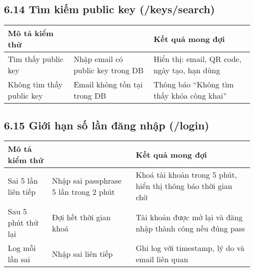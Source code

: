 \subsection*{6.14 Tìm kiếm public key (/keys/search)}
\begin{table}[H]
\centering
\begin{tabular}{|>{\centering\arraybackslash}p{4.3cm}|>{\arraybackslash}p{5cm}|>{\centering\arraybackslash}p{7.5cm}|}
\hline
\textbf{Mô tả kiểm thử} &
\multicolumn{1}{>{\centering\arraybackslash}p{5cm}|}{\textbf{Input}} & 
\textbf{Kết quả mong đợi} \\ \hline
Tìm thấy public key & Nhập email có public key trong DB & Hiển thị: email, QR code, ngày tạo, hạn dùng \\ \hline
Không tìm thấy public key & Email không tồn tại trong DB & Thông báo “Không tìm thấy khóa công khai” \\ \hline
\end{tabular}
\end{table}

\subsection*{6.15 Giới hạn số lần đăng nhập (/login)}
\begin{table}[H]
\centering
\begin{tabular}{|>{\centering\arraybackslash}p{4.3cm}|>{\arraybackslash}p{5cm}|>{\centering\arraybackslash}p{7.5cm}|}
\hline
\textbf{Mô tả kiểm thử} &
\multicolumn{1}{>{\centering\arraybackslash}p{5cm}|}{\textbf{Input}} & 
\textbf{Kết quả mong đợi} \\ \hline
Sai 5 lần liên tiếp & Nhập sai passphrase 5 lần trong 2 phút & Khoá tài khoản trong 5 phút, hiển thị thông báo thời gian chờ \\ \hline
Sau 5 phút thử lại & Đợi hết thời gian khoá & Tài khoản được mở lại và đăng nhập thành công nếu đúng pass \\ \hline
Log mỗi lần sai & Nhập sai liên tiếp & Ghi log với timestamp, lý do và email liên quan \\ \hline
\end{tabular}
\end{table}


